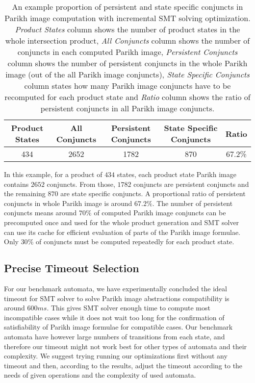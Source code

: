 \begin{table*}[ht]
	\centering
	\small
    \begin{tabular}{ |c|c|c|c|c| }
        \hline
        Product States & All Conjuncts & Persistent Conjuncts & State Specific Conjuncts & Ratio \\ \hline
        434 & 2652 & 1782 & 870 & 67.2\% \\ \hline
    \end{tabular}
    \caption{An example proportion of persistent and state specific conjuncts in Parikh image computation with incremental SMT solving optimization. \emph{Product States} column shows the number of product states in the whole intersection product, \emph{All Conjuncts} column shows the number of conjuncts in each computed Parikh image, \emph{Persistent Conjuncts} column shows the number of persistent conjuncts in the whole Parikh image (out of the all Parikh image conjuncts), \emph{State Specific Conjuncts} column states how many Parikh image conjuncts have to be recomputed for each product state and \emph{Ratio} column shows the ratio of persistent conjuncts in all Parikh image conjuncts.}
    \label{table:incremental_smt_clauses}
\end{table*}

In this example, for a product of $434$ states, each product state Parikh image contains $2652$ conjuncts. From those, $1782$ conjuncts are persistent conjuncts and the remaining $870$ are state specific conjuncts. A proportional ratio of persistent conjuncts in whole Parikh image is around $67.2 \%$. The number of persistent conjuncts means around $70\%$ of computed Parikh image conjuncts can be precomputed once and used for the whole product generation and SMT solver can use its cache for efficient evaluation of parts of the Parikh image formulae. Only $30\%$ of conjuncts must be computed repeatedly for each product state.

\subsection{Precise Timeout Selection}

For our benchmark automata, we have experimentally concluded the ideal timeout for SMT solver to solve Parikh image abstractions compatibility is around $600 ms$. This gives SMT solver enough time to compute most incompatible cases while it does not wait too long for the confirmation of satisfiability of Parikh image formulae for compatible cases. Our benchmark automata have however large numbers of transitions from each state, and therefore our timeout might not work best for other types of automata and their complexity. We suggest trying running our optimizations first without any timeout and then, according to the results, adjust the timeout according to the needs of given operations and the complexity of used automata.

